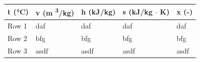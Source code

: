 \documentclass{article}
\begin{document}
\begin{table}[ht]
\centering

\begin{tabularx}{\textwidth}{|Y|Y|Y|Y|Y|}
\hline
\textbf{t (°C)} & \textbf{v (m \textsuperscript{3}/kg)} & \textbf{h (kJ/kg)} & \textbf{s (kJ/kg $\cdot$ K)} & \textbf{x} (-)\\
\hline


Row 1 & 

daf & 

daf & 

daf & 

daf
 \\
\hline
%

Row 2 & 

bfg & 

bfg & 

bfg & 

bfg
 \\
\hline
%

Row 3 & 

asdf & 

asdf & 

asdf & 

asdf
 \\
\hline
%
\end{tabularx}
\end{table}
\end{document}
